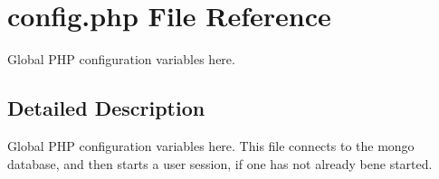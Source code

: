 \hypertarget{config_8php}{\section{config.\-php \-File \-Reference}
\label{config_8php}
}


\-Global \-P\-H\-P configuration variables here.  




\subsection{\-Detailed \-Description}
\-Global \-P\-H\-P configuration variables here. \-This file connects to the mongo database, and then starts a user session, if one has not already bene started. 